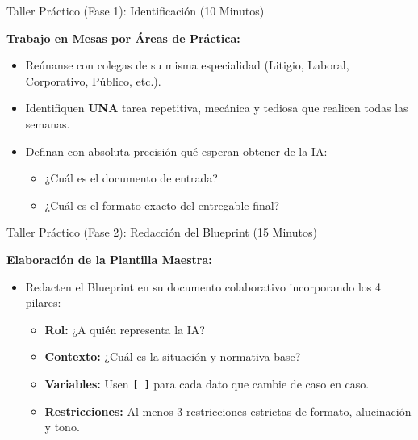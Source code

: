 \documentclass[aspectratio=169]{beamer}
\begin{document}
\begin{frame}{Taller Práctico (Fase 1): Identificación (10 Minutos)}

\textbf{Trabajo en Mesas por Áreas de Práctica:}
\begin{itemize}
  \item Reúnanse con colegas de su misma especialidad (Litigio, Laboral, Corporativo, Público, etc.).
  \item Identifiquen \textbf{UNA} tarea repetitiva, mecánica y tediosa que realicen todas las semanas.
  \item Definan con absoluta precisión qué esperan obtener de la IA:
  \begin{itemize}
    \item ¿Cuál es el documento de entrada?
    \item ¿Cuál es el formato exacto del entregable final?
  \end{itemize}
\end{itemize}
\end{frame}

\begin{frame}{Taller Práctico (Fase 2): Redacción del Blueprint (15 Minutos)}

\textbf{Elaboración de la Plantilla Maestra:}
\begin{itemize}
  \item Redacten el Blueprint en su documento colaborativo incorporando los 4 pilares:
  \begin{itemize}
    \item \textbf{Rol:} ¿A quién representa la IA?
    \item \textbf{Contexto:} ¿Cuál es la situación y normativa base?
    \item \textbf{Variables:} Usen \texttt{[ ]} para cada dato que cambie de caso en caso.
    \item \textbf{Restricciones:} Al menos 3 restricciones estrictas de formato, alucinación y tono.
  \end{itemize}
\end{itemize}
\end{frame}
\end{document}
